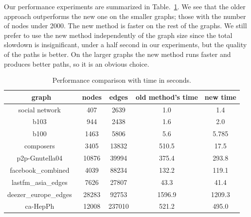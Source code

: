 \documentclass{gd-llncs}
\begin{document}
{%


Our performance experiments are summarized in Table.~\ref{tab:perf}. We see that the older approach outperforms the new one on the smaller graphs; those with the number of nodes under 2000. The new method is faster on the rest of the graphs. We still prefer to use the new method independently of the graph size since the total slowdown is insignificant, under a half second in our experiments, but the quality of the paths is better. On the larger graphs the new method runs faster and produces better paths, so it is an obvious choice.
\begin{table}
  \begin{center}
    \begin{tabular}{||c |c| c| c| c||}
      \hline
      graph                                   & nodes & edges  & old method's time & new time \\ [0.5ex]
      \hline\hline
      social network~\cite{beveridge2018game} & 407   & 2639   & 1.0               & 1.4      \\
      \hline
      b103~\cite{b103}                        & 944   & 2438   & 1.6               & 2.0      \\
      \hline
      b100~\cite{b100}                        & 1463  & 5806   & 5.6               & 5.785    \\
      \hline
      composers~\cite{composers}              & 3405  & 13832  & 510.5             & 17.5     \\
      \hline
      p2p-Gnutella04~\cite{gnutella}          & 10876 & 39994  & 375.4             & 293.8    \\
      \hline
      facebook\_combined~\cite{fb}            & 4039  & 88234  & 132.2             & 119.1    \\
      \hline
      lastfm\_asia\_edges~\cite{feather}      & 7626  & 27807  & 43.3              & 41.4     \\
      \hline
      deezer\_europe\_edges~\cite{feather}    & 28283 & 92753  & 1596.9            & 1209.3   \\
      \hline
      ca-HepPh~\cite{leskovec2007graph}       & 12008 & 237010 & 521.2             & 495.0    \\
      \hline
    \end{tabular}
    \caption{Performance comparison with time in seconds.}
    \label{tab:perf}
  \end{center}


\end{table}}
\end{document}
